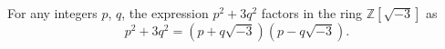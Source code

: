 For any integers $p$, $q$, the expression $p^2 + 3q^2$ factors in the ring $\mathbb{Z}[\sqrt{-3}]$ as
$$p^2 + 3q^2 = (p + q\sqrt{-3})(p - q\sqrt{-3}).$$
